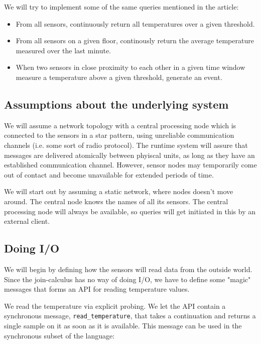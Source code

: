 We will try to implement some of the same queries mentioned in the article:

\begin{itemize}
\item
  From all sensors, continuously return all temperatures over a given
  threshold.

\item
  From all sensors on a given floor, continously return the average
  temperature measured over the last minute.

\item
  When two sensors in close proximity to each other in a given time
  window measure a temperature above a given threshold, generate an
  event.

\end{itemize}
\subsection{Assumptions about the underlying system}

We will assume a network topology with a central processing node
which is connected to the sensors in a star pattern, using
unreliable communication channels (i.e. some sort of radio
protocol). The runtime system will assure that messages are
delivered atomically between phyiscal units, as long as they have
an established communication channel. However, sensor nodes may
temporarily come out of contact and become unavailable for extended
periods of time.

We will start out by assuming a static network, where nodes doesn't
move around. The central node knows the names of all its sensors.
The central processing node will always be available, so queries
will get initiated in this by an external client.

\subsection{Doing I/O}

We will begin by defining how the sensors will read data from the
outside world. Since the join-calculus has no way of doing I/O, we
have to define some "magic" messages that forms an API for reading
temperature values.

We read the temperature via explicit probing. We let the API
contain a synchronous message, \verb!read_temperature!, that takes
a continuation and returns a single sample on it as soon as it is
available. This message can be used in the synchronous subset of
the language:

